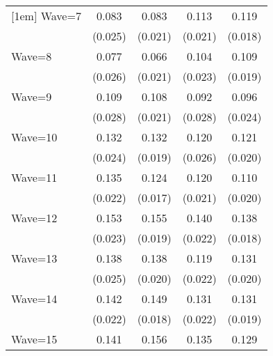 {\begin{tabular}{l*{4}{c}}
[1em]
Wave=7              &       0.083\sym{**} &       0.083\sym{***}&       0.113\sym{***}&       0.119\sym{***}\\
                    &     (0.025)         &     (0.021)         &     (0.021)         &     (0.018)         \\
[1em]
Wave=8              &       0.077\sym{**} &       0.066\sym{**} &       0.104\sym{***}&       0.109\sym{***}\\
                    &     (0.026)         &     (0.021)         &     (0.023)         &     (0.019)         \\
[1em]
Wave=9              &       0.109\sym{***}&       0.108\sym{***}&       0.092\sym{**} &       0.096\sym{***}\\
                    &     (0.028)         &     (0.021)         &     (0.028)         &     (0.024)         \\
[1em]
Wave=10             &       0.132\sym{***}&       0.132\sym{***}&       0.120\sym{***}&       0.121\sym{***}\\
                    &     (0.024)         &     (0.019)         &     (0.026)         &     (0.020)         \\
[1em]
Wave=11             &       0.135\sym{***}&       0.124\sym{***}&       0.120\sym{***}&       0.110\sym{***}\\
                    &     (0.022)         &     (0.017)         &     (0.021)         &     (0.020)         \\
[1em]
Wave=12             &       0.153\sym{***}&       0.155\sym{***}&       0.140\sym{***}&       0.138\sym{***}\\
                    &     (0.023)         &     (0.019)         &     (0.022)         &     (0.018)         \\
[1em]
Wave=13             &       0.138\sym{***}&       0.138\sym{***}&       0.119\sym{***}&       0.131\sym{***}\\
                    &     (0.025)         &     (0.020)         &     (0.022)         &     (0.020)         \\
[1em]
Wave=14             &       0.142\sym{***}&       0.149\sym{***}&       0.131\sym{***}&       0.131\sym{***}\\
                    &     (0.022)         &     (0.018)         &     (0.022)         &     (0.019)         \\
[1em]
Wave=15             &       0.141\sym{***}&       0.156\sym{***}&       0.135\sym{***}&       0.129\sym{***}\\

\end{tabular}}
